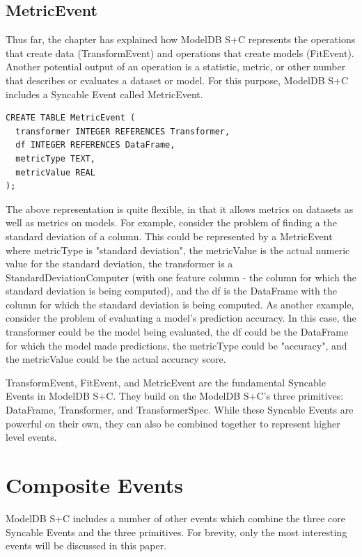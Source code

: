 \subsection{MetricEvent}
Thus far, the chapter has explained how ModelDB S+C represents the operations that create data (TransformEvent)
and operations that create models (FitEvent). Another potential output of an operation is a statistic, metric, or
other number that describes or evaluates a dataset or model. For this purpose, ModelDB S+C includes a Syncable Event
called MetricEvent.

\begin{verbatim}
CREATE TABLE MetricEvent (
  transformer INTEGER REFERENCES Transformer,
  df INTEGER REFERENCES DataFrame,
  metricType TEXT,
  metricValue REAL
);
\end{verbatim}

The above representation is quite flexible, in that it allows metrics on datasets as well as
metrics on models. For example, consider the problem of finding a the standard deviation of a column.
This could be represented by a MetricEvent where metricType is "standard deviation", the metricValue
is the actual numeric value for the standard deviation, the transformer is a StandardDeviationComputer (with
one feature column - the column for which the standard deviation is being computed), and the df is the
DataFrame with the column for which the standard deviation is being computed. As another example, consider
the problem of evaluating a model's prediction accuracy. In this case, the transformer could be the model being
evaluated, the df could be the DataFrame for which the model made predictions, the metricType could be "accuracy",
and the metricValue could be the actual accuracy score.

TransformEvent, FitEvent, and MetricEvent are the fundamental Syncable Events in ModelDB S+C. They build on the
ModelDB S+C's three primitives: DataFrame, Transformer, and TransformerSpec. While these Syncable Events are powerful on
their own, they can also be combined together to represent higher level events.

\section{Composite Events}
ModelDB S+C includes a number of other events which combine the three core Syncable Events and the three primitives.
For brevity, only the most interesting events will be discussed in this paper.

